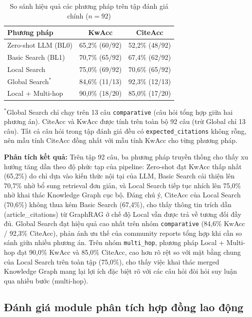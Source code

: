 \documentclass[../DoAn.tex]{subfiles}
\begin{document}
\begin{table}[htbp]
\centering
\caption{So sánh hiệu quả các phương pháp trên tập đánh giá chính ($n=92$)}
\label{table:overall_comparison}
\begin{tabular}{|l|c|c|}
\hline
\textbf{Phương pháp} & \textbf{KwAcc} & \textbf{CiteAcc} \\
\hline
Zero-shot LLM (BL0)  & 65,2\% (60/92) & 52,2\% (48/92) \\
Basic Search (BL1)   & 70,7\% (65/92) & 67,4\% (62/92) \\
Local Search         & 75,0\% (69/92) & 70,6\% (65/92) \\
Global Search$^*$    & 84,6\% (11/13) & 92,3\% (12/13) \\
Local + Multi-hop    & 90,0\% (18/20) & 85,0\% (17/20) \\
\hline
\end{tabular}
\end{table}

$^*$Global Search chỉ chạy trên 13 câu \texttt{comparative} (câu hỏi tổng hợp giữa hai phương án). CiteAcc và KwAcc được tính trên toàn bộ 92 câu (trừ Global chỉ 13 câu). Tất cả câu hỏi trong tập đánh giá đều có \texttt{expected\_citations} không rỗng, nên mẫu tính CiteAcc đồng nhất với mẫu tính KwAcc cho từng phương pháp.

\textbf{Phân tích kết quả:} Trên tập 92 câu, ba phương pháp truyền thống cho thấy xu hướng tăng dần theo độ phức tạp của pipeline: Zero-shot đạt KwAcc thấp nhất (65,2\%) do chỉ dựa vào kiến thức nội tại của LLM, Basic Search cải thiện lên 70,7\% nhờ bổ sung retrieval đơn giản, và Local Search tiếp tục nhích lên 75,0\% nhờ khai thác Knowledge Graph cục bộ. Đáng chú ý, CiteAcc của Local Search (70,6\%) không thua kém Basic Search (67,4\%), cho thấy thông tin trích dẫn (article\_citations) từ GraphRAG ở chế độ Local vẫn được trả về tương đối đầy đủ. Global Search đạt hiệu quả cao nhất trên nhóm \texttt{comparative} (84,6\% KwAcc / 92,3\% CiteAcc), phản ánh ưu thế của community reports tổng hợp khi cần so sánh giữa nhiều phương án. Trên nhóm \texttt{multi\_hop}, phương pháp Local + Multi-hop đạt 90,0\% KwAcc và 85,0\% CiteAcc, cao hơn rõ rệt so với mặt bằng chung của Local Search trên toàn tập (75,0\%), cho thấy việc khai thác merged Knowledge Graph mang lại lợi ích đặc biệt rõ với các câu hỏi đòi hỏi suy luận qua nhiều bước (multi-hop).

\subsection{Đánh giá module phân tích hợp đồng lao động}
\label{subsection:4.4.3}
\end{document}
